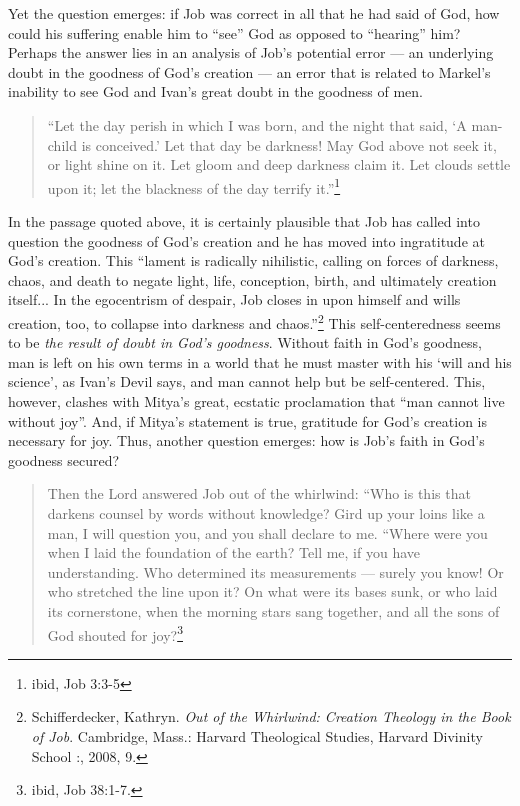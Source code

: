     Yet the question emerges: if Job was correct in all that he had said of God, how could his suffering enable him to ``see'' God as opposed to ``hearing'' him? Perhaps the answer lies in an analysis of Job's potential error --- an underlying doubt in the goodness of God's creation --- an error that is related to Markel's inability to see God and Ivan's great doubt in the goodness of men.
    
    \begin{quote}
    \onehalfspacing
    ``Let the day perish in which I was born, and the night that said, `A man-child is conceived.' Let that day be darkness! May God above not seek it, or light shine on it. Let gloom and deep darkness claim it. Let clouds settle upon it; let the blackness of the day terrify it.''\footnote{ibid, Job 3:3-5}
    \end{quote}
    
    In the passage quoted above, it is certainly plausible that Job has called into question the goodness of God's creation and he has moved into ingratitude at God's creation. This ``lament is radically nihilistic, calling on forces of darkness, chaos, and death to negate light, life, conception, birth, and ultimately creation itself... In the egocentrism of despair, Job closes in upon himself and wills creation, too, to collapse into darkness and chaos.''\footnote{Schifferdecker, Kathryn. \emph{Out of the Whirlwind: Creation Theology in the Book of Job}. Cambridge, Mass.: Harvard Theological Studies, Harvard Divinity School :, 2008, 9.} This self-centeredness seems to be \emph{the result of doubt in God's goodness}. Without faith in God's goodness, man is left on his own terms in a world that he must master with his `will and his science', as Ivan's Devil says, and man cannot help but be self-centered. This, however, clashes with Mitya's great, ecstatic proclamation that ``man cannot live without joy''. And, if Mitya's statement is true, gratitude for God's creation is necessary for joy. Thus, another question emerges: how is Job's faith in God's goodness secured?   
    

\begin{quote}
Then the Lord answered Job out of the whirlwind: ``Who is this that darkens counsel by words without knowledge? Gird up your loins like a man, I will question you, and you shall declare to me. ``Where were you when I laid the foundation of the earth? Tell me, if you have understanding. Who determined its measurements --- surely you know! Or who stretched the line upon it? On what were its bases sunk, or who laid its cornerstone, when the morning stars sang together, and all the sons of God shouted for joy?\footnote{ibid, Job 38:1-7.}
\end{quote}

